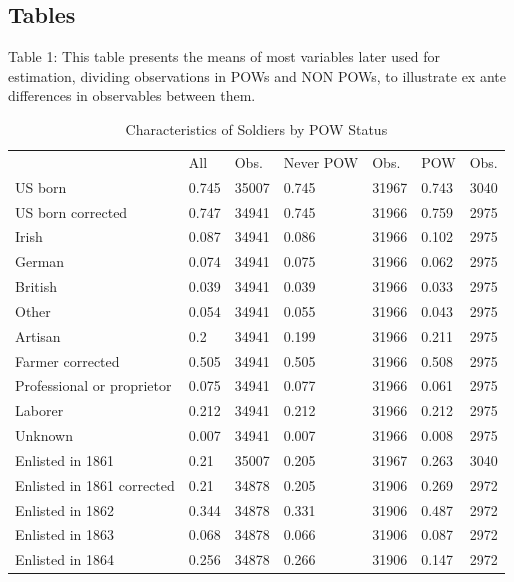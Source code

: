 \documentclass[draft.tex]{subfiles}
\begin{document}
\subsection{Tables}
Table 1: This table presents the means of most variables later used for estimation, dividing observations in POWs and NON POWs, to illustrate ex ante differences in observables between them.

\begin{table}[bt]
\centering
\caption{Characteristics of Soldiers by POW Status}
\label{characteristics}
\begin{tabular}{lllllll}
\hline
                           & All   & Obs.  & Never POW & Obs.  & POW   & Obs. \\
US born                    & 0.745 & 35007 & 0.745     & 31967 & 0.743 & 3040 \\
US born corrected          & 0.747 & 34941 & 0.745     & 31966 & 0.759 & 2975 \\
Irish                      & 0.087 & 34941 & 0.086     & 31966 & 0.102 & 2975 \\
German                     & 0.074 & 34941 & 0.075     & 31966 & 0.062 & 2975 \\
British                    & 0.039 & 34941 & 0.039     & 31966 & 0.033 & 2975 \\
Other                      & 0.054 & 34941 & 0.055     & 31966 & 0.043 & 2975 \\
Artisan                    & 0.2   & 34941 & 0.199     & 31966 & 0.211 & 2975 \\
Farmer corrected           & 0.505 & 34941 & 0.505     & 31966 & 0.508 & 2975 \\
Professional or proprietor & 0.075 & 34941 & 0.077     & 31966 & 0.061 & 2975 \\
Laborer                    & 0.212 & 34941 & 0.212     & 31966 & 0.212 & 2975 \\
Unknown                    & 0.007 & 34941 & 0.007     & 31966 & 0.008 & 2975 \\
Enlisted in 1861           & 0.21  & 35007 & 0.205     & 31967 & 0.263 & 3040 \\
Enlisted in 1861 corrected & 0.21  & 34878 & 0.205     & 31906 & 0.269 & 2972 \\
Enlisted in 1862                  & 0.344   & 34878 & 0.331   & 31906 & 0.487  & 2972 \\
Enlisted in 1863                  & 0.068   & 34878 & 0.066   & 31906 & 0.087  & 2972 \\
Enlisted in 1864                  & 0.256   & 34878 & 0.266   & 31906 & 0.147  & 2972 \\

\end{tabular}
\end{table}
\end{document}
